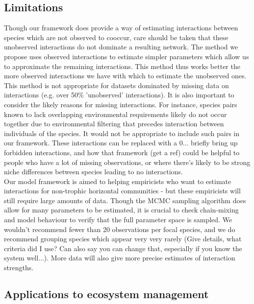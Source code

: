\documentclass[a4,12pt]{article}
\begin{document}

    \subsection{Limitations}
        
        Though our framework does provide a way of estimating interactions between species which are not observed to cooccur, care should be taken that these unobserved interactions do not dominate a resulting network. The method we propose uses observed interactions to estimate simpler parameters which allow us to approximate the remaining interactions. This method thus works better the more observed interactions we have with which to estimate the unobserved ones. This method is not appropriate for datasets dominated by missing data on interactions (e.g. over 50\% 'unobserved' interactions).  It is also important to consider the likely reasons for missing interactions.  For instance, species pairs known to lack overlapping environmental requirements likely do not occur together due to environmental filtering that precedes interaction between individuals of the species.  It would not be appropriate to include such pairs in our framework. These interactions can be replaced with a 0... briefly bring up forbidden interactions, and how that framework (get a ref) could be helpful to people who have a lot of missing observations, or where there’s likely to be strong niche differences between species leading to no interactions. \\

        Our model framework is aimed to helping empiricists who want to estimate interactions for non-trophic horizontal communities - but these empiricists will still require large amounts of data. Though the MCMC sampling algorithm does allow for many parameters to be estimated, it is crucial to check chain-mixing and model behaviour to verify that the full parameter space is sampled. We wouldn't recommend fewer than 20 observations per focal species, and we do recommend grouping species which appear very very rarely (Give details, what criteria did I use? Can also say you can change that, especially if you know the system well...). More data will also give more precise estimates of interaction strengths.   


    \subsection{Applications to ecosystem management}
\end{document}

